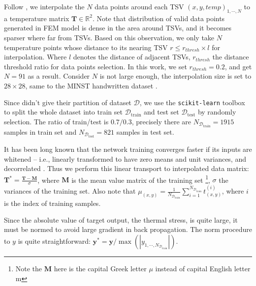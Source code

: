 \begin{description}[labelsep=0.5em]
    \item[Data Interpolation] Follow \cite{Zhang2016Fast}, we interpolate the $N$ data points 
    around each TSV $\left(x,y,temp\right)_{1,\cdots,N}$
    to a temperature matrix $\mathbf{T}\in\mathbb{R}^2$.
    Note that distribution of valid data points generated in FEM model is dense in
    the area around TSVs, and it becomes sparser where far from TSVs.
    Based on this observation, we only take $N$ temperature points whose distance to its nearing TSV 
    $r \le r_{thresh} \times l$ for interpolation. Where $l$ denotes the distance of adjacent TSVs,
    $r_{thresh}$ the distance threshold ratio for data points selection. \label{itm::interp}
    In this work, we set $r_{thresh}=0.2$, and get $N=91$ as a result.
    Consider $N$ is not large enough, the interpolation size is set to $28\times28$,
    same to the MINST handwritten dataset \cite{lecun1998gradient}.
       
    \item[Train-Test Splitting] Since \cite{Zhang2016Fast} didn't give their partition of dataset $\mathcal{D}$,
    we use the \texttt{scikit-learn} toolbox to split the whole dataset into 
    train set $\mathcal{D}_{\textrm{train}}$ and test set $\mathcal{D}_{\textrm{test}}$
    by randomly selection.
    The ratio of train/test is $0.7 / 0.3$, precisely there are 
    $N_{\mathcal{D}_{\textrm{train}}}=1915$ samples in train set
    and $N_{\mathcal{D}_{\textrm{test}}}=821$ samples in test set.
    
    \item[Whitening Input] It has been long known that the network training converges faster 
    if its inputs are whitened – i.e., 
    linearly transformed to have zero means and unit variances, and decorrelated \cite{orr2003neural}.
    Thus we perform this linear transport to interpolated data matrix: 
    $\mathbf{T}^* = \frac{\mathbf{T} - \mathbf{M}}{\sigma}$, 
    where $\mathbf{M}$ is the mean value matrix of the training set \footnote{Note the $\mathbf{M}$
    here is the capital Greek letter $\mu$ instead of capital English letter m},
    $\sigma$ the variances of the training set.
    Also note that $\mu_{\left(x,y\right)} = \frac{1}{N_{\mathcal{D}_{\textrm{train}}}} \sum_{i=1}^{N_{\mathcal{D}_{\textrm{train}}}} 
    t^{\left(i\right)}_{\left(x,y\right)}$, where $i$ is the index of training samples.
    
    \item[Scaling Output] Since the absolute value of target output, the thermal stress, is
    quite large, it must be normed to avoid large gradient in back propagation.
    The norm procedure to $y$ is quite straightforward:
    $\mathbf{y}^* = \mathbf{y} / \max \left(\left|y_{1,\cdots,N_{\mathcal{D}_{\textrm{train}}}}\right|\right)$.
\end{description}
